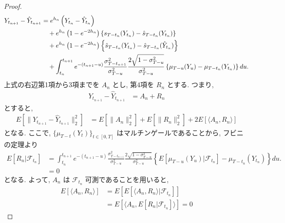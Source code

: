 \documentclass[11pt,a4paper]{ltjsarticle}
\theoremstyle{remark}
\begin{document}
\begin{proof}
    \begin{align}
        Y_{t_{n+1}}-\hat{Y}_{t_{n+1}}
        &=
        e^{h_n}
        \left(
            Y_{t_n}-\hat{Y}_{t_n}
        \right)
        \notag\\
        &\quad
        +
        e^{h_n}
        \left(
            1-e^{-2h_n}
        \right)
        \left\{
            s_{T-t_n}(Y_{t_n})
            -
            \hat{s}_{T-t_n}(Y_{t_n})
        \right\}
        \notag\\
        &\quad
        +
        e^{h_n}
        \left(
            1-e^{-2h_n}
        \right)
        \left\{
            \hat{s}_{T-t_n}(Y_{t_n})
            -
            \hat{s}_{T-t_n}(\hat{Y}_{t_n})
        \right\}
        \notag\\
        &\quad
        +
        \int_{t_n}^{t_{n+1}}
        e^{-(t_{n+1}-u)}
        \frac{\sigma^2_{T-t_{n+1}}}{\sigma^2_{T-u}}
        \frac{2\sqrt{1-\sigma^2_{T-u}}}{\sigma^2_{T-u}}
        \left\{
            \mu_{T-u}(Y_u)
            -
            \mu_{T-t_n}(Y_{t_n})
        \right\}
        du .
    \end{align}
    上式の右辺第1項から3項までを $A_n$ とし, 第4項を $R_n$ とする. つまり, 
    \begin{align}
        Y_{t_{n+1}}-\hat{Y}_{t_{n+1}}
        &=A_n+R_n
    \end{align}
    とすると, 
    \begin{align}
        E[\|Y_{t_{n+1}}-\hat{Y}_{t_{n+1}}\|^2_2]
        &=E[\|A_n\|^2_2]+E[\|R_n\|^2_2]+ 2E[\langle A_n,R_n\rangle]
    \end{align}
    となる.
    ここで, $\{\mu_{T-t}(Y_t)\}_{t\in[0,T]}$ はマルチンゲールであることから, フビニの定理より
    \begin{align}
        E[R_n|\mathcal{F}_{t_n}]&=        \int_{t_n}^{t_{n+1}}
        e^{-(t_{n+1}-u)}
        \frac{\sigma^2_{T-t_{n+1}}}{\sigma^2_{T-u}}
        \frac{2\sqrt{1-\sigma^2_{T-u}}}{\sigma^2_{T-u}}
        \left\{
            E[\mu_{T-u}(Y_u)|\mathcal{F}_{t_n}]
            -
            \mu_{T-t_n}(Y_{t_n})
        \right\}
        du .\\
        &=0
    \end{align}
    となる. よって, $A_n$ は $\mathcal{F}_{t_n}$ 可測であることを用いると, 
    \begin{align}
        E[\langle A_n,R_n\rangle]&=E[E[\langle A_n,R_n\rangle|\mathcal{F}_{t_n}]]\\
        &=E[\langle A_n,E[R_n|\mathcal{F}_{t_n}]\rangle]=0
    \end{align}

\end{proof}
\end{document}
